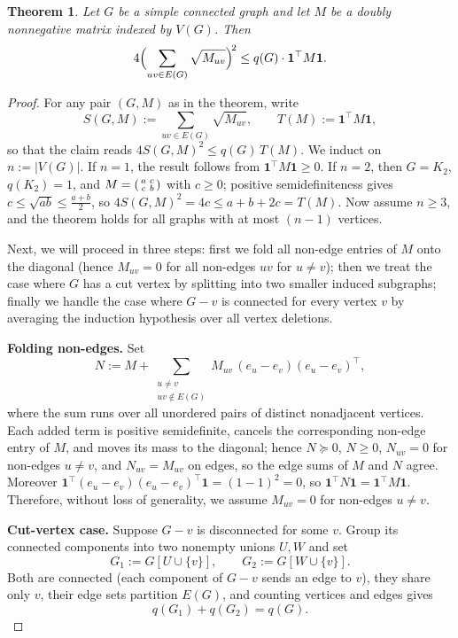 \documentclass[11pt,letterpaper,reqno]{amsart}
\newtheorem{theorem}{Theorem}[section]
\theoremstyle{definition}
\newcommand{\ones}{\mathbf 1}
\begin{document}
\begin{theorem}\label{thm:sparse}
Let $G$ be a simple connected graph and let $M$ be a doubly nonnegative matrix
indexed by $V(G)$. Then
\[
    4\Bigl(\sum_{uv\in E(G)}\sqrt{M_{uv}}\Bigr)^{\!2}
    \le q(G)\cdot\ones^{\top}M\ones.
\]
\end{theorem}
\begin{proof}
For any pair $(G,M)$ as in the theorem, write
\[
    S(G,M):=\sum_{uv\in E(G)}\sqrt{M_{uv}},
    \qquad
    T(M):=\ones^{\top}M\ones,
\]
so that the claim reads $4S(G,M)^2\le q(G)\,T(M)$.  We induct on
$n:=|V(G)|$.  If $n=1$, the result follows from $\ones^{\top}M\ones \geq 0$. If $n=2$, then $G=K_2$,
$q(K_2)=1$, and $M=\begin{psmallmatrix}a&c\\c&b\end{psmallmatrix}$ with
$c\ge0$; positive semidefiniteness gives
$c\le\sqrt{ab}\le\tfrac{a+b}2$, so
$4S(G,M)^2=4c\le a+b+2c=T(M)$.  Now assume $n\ge3$, and the theorem holds for all graphs with at most $(n - 1)$ vertices.

Next, we will proceed in three steps: first we fold all non-edge entries of $M$ onto the diagonal (hence $M_{uv} = 0$ for all non-edges $uv$ for $u\neq v$); then we treat the case where $G$ has a cut vertex by splitting into two smaller induced subgraphs; finally we handle the case where $G-v$ is connected for every vertex $v$ by averaging the induction hypothesis over all vertex deletions.

\medskip
\noindent\textbf{Folding non-edges.}
Set
\[
    N:=M+\sum_{\substack{u\ne v\\ uv\notin E(G)}}
    M_{uv}\,(e_u-e_v)(e_u-e_v)^{\top},
\]
where the sum runs over all unordered pairs of distinct nonadjacent
vertices.  Each added term is
positive semidefinite, cancels the corresponding non-edge entry of
$M$, and moves its mass to the diagonal; hence $N\succeq0$, $N\ge0$,
$N_{uv}=0$ for non-edges $u\ne v$, and $N_{uv}=M_{uv}$ on edges, so
the edge sums of $M$ and $N$ agree.  Moreover
$\ones^{\top}(e_u-e_v)(e_u-e_v)^{\top}\ones=(1-1)^2=0$, so
$\ones^{\top}N\ones=\ones^{\top}M\ones$. Therefore, without loss of generality, we assume $M_{uv} = 0$ for non-edges $u\ne v$.

\medskip
\noindent\textbf{Cut-vertex case.}
Suppose $G-v$ is disconnected for some $v$.  Group its connected components into
two nonempty unions $U,W$ and set
\[
    G_1:=G[U\cup\{v\}],
    \qquad
    G_2:=G[W\cup\{v\}].
\]
Both are connected (each component of $G-v$ sends an edge to $v$), they
share only $v$, their edge sets partition $E(G)$, and counting vertices
and edges gives
\[
    q(G_1)+q(G_2)=q(G).
\]


\end{proof}
\end{document}
